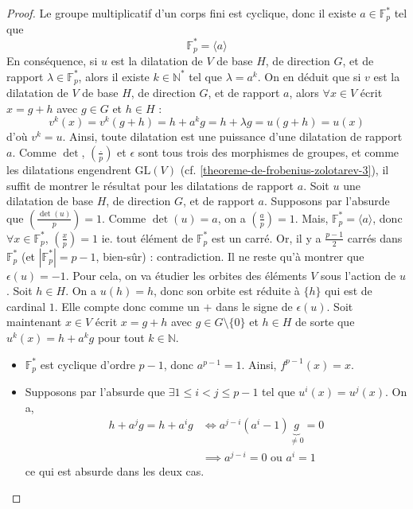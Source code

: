	\begin{proof}
		Le groupe multiplicatif d'un corps fini est cyclique, donc il existe $a \in \mathbb{F}_p^*$ tel que
		\[ \mathbb{F}_p^* = \langle a \rangle \]
		En conséquence, si $u$ est la dilatation de $V$ de base $H$, de direction $G$, et de rapport $\lambda \in \mathbb{F}_p^*$, alors il existe $k \in \mathbb{N}^*$ tel que $\lambda = a^k$. On en déduit que si $v$ est la dilatation de $V$ de base $H$, de direction $G$, et de rapport $a$, alors $\forall x \in V$ écrit $x = g + h$ avec $g \in G$ et $h \in H$ :
		\[ v^k(x) = v^k(g+h) = h + a^k g = h + \lambda g = u(g+h) = u(x) \]
		d'où $v^k = u$. Ainsi, toute dilatation est une puissance d'une dilatation de rapport $a$.
		\newpar
		Comme $\det$, $\left( \frac{.}{p} \right)$ et $\epsilon$ sont tous trois des morphismes de groupes, et comme les dilatations engendrent $\mathrm{GL}(V)$ (cf. \cref{theoreme-de-frobenius-zolotarev-3}), il suffit de montrer le résultat pour les dilatations de rapport $a$.
		\newpar
		Soit $u$ une dilatation de base $H$, de direction $G$, et de rapport $a$. Supposons par l'absurde que $\left( \frac{\det(u)}{p} \right) = 1$. Comme $\det(u) = a$, on a $\left( \frac{a}{p} \right) = 1$. Mais, $\mathbb{F}_p^* = \langle a \rangle$, donc $\forall x \in \mathbb{F}_p^*$, $\left( \frac{x}{p} \right) = 1$ ie. tout élément de $\mathbb{F}_p^*$ est un carré. Or, il y a $\frac{p-1}{2}$ carrés dans $\mathbb{F}_p^*$ (et $|\mathbb{F}_p^*| = p-1$, bien-sûr) : contradiction.
		\newpar
		Il ne reste qu'à montrer que $\epsilon(u) = -1$. Pour cela, on va étudier les orbites des éléments $V$ sous l'action de $u$.
		\newpar
		Soit $h \in H$. On a $u(h) = h$, donc son orbite est réduite à $\{ h \}$ qui est de cardinal $1$. Elle compte donc comme un $+$ dans le signe de $\epsilon(u)$.
		\newpar
		Soit maintenant $x \in V$ écrit $x = g + h$ avec $g \in G \setminus \{ 0 \}$ et $h \in H$ de sorte que $u^k (x) = h + a^k g$ pour tout $k \in \mathbb{N}$.
		\begin{itemize}
			\item $\mathbb{F}_p^*$ est cyclique d'ordre $p-1$, donc $a^{p-1} = 1$. Ainsi, $f^{p-1} (x) = x$.
			\item Supposons par l'absurde que $\exists 1 \leq i < j \leq p-1$ tel que $u^i(x) = u^j(x)$. On a,
			\begin{align*}
				h + a^j g = h + a^i g &\iff a^{j-i} (a^i - 1) \underbrace{g}_{\neq 0} = 0 \\
				&\implies a^{j-i} = 0 \text{ ou } a^i = 1
			\end{align*}
			ce qui est absurde dans les deux cas.

\end{itemize}
\end{proof}
